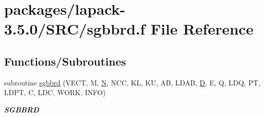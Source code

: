 \hypertarget{sgbbrd_8f}{}\section{packages/lapack-\/3.5.0/\+S\+R\+C/sgbbrd.f File Reference}
\label{sgbbrd_8f}
\subsection*{Functions/\+Subroutines}
\begin{DoxyCompactItemize}
\item 
subroutine \hyperlink{group__realGBcomputational_ga1929cafd58d8fe59c200282e4497da0a}{sgbbrd} (V\+E\+C\+T, M, \hyperlink{polmisc_8c_a0240ac851181b84ac374872dc5434ee4}{N}, N\+C\+C, K\+L, K\+U, A\+B, L\+D\+A\+B, \hyperlink{odrpack_8h_a7dae6ea403d00f3687f24a874e67d139}{D}, E, Q, L\+D\+Q, P\+T, L\+D\+P\+T, C, L\+D\+C, W\+O\+R\+K, I\+N\+F\+O)
\begin{DoxyCompactList}\small\item\em {\bfseries S\+G\+B\+B\+R\+D} \end{DoxyCompactList}\end{DoxyCompactItemize}
